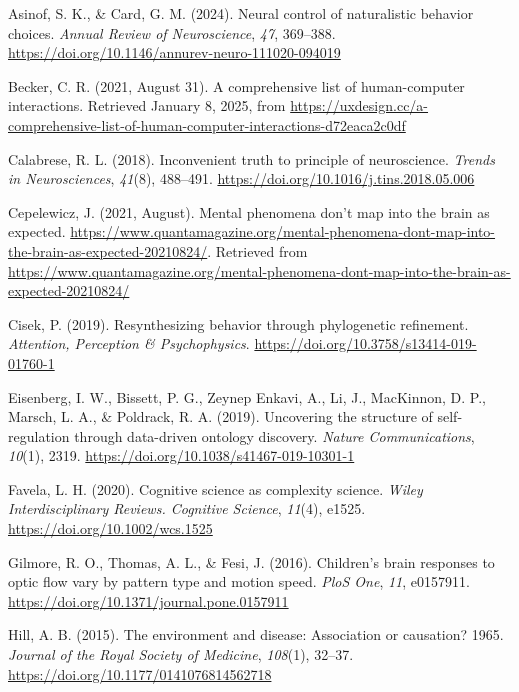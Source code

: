 \documentclass[
  letterpaper,
  DIV=11,
  numbers=noendperiod]{scrartcl}
\newlength{\cslhangindent}
\newenvironment{CSLReferences}[2] %
 {\begin{list}{}{%
  \setlength{\itemindent}{0pt}
  \setlength{\leftmargin}{0pt}
  \setlength{\parsep}{0pt}
  \ifodd #1
   \setlength{\leftmargin}{\cslhangindent}
   \setlength{\itemindent}{-1\cslhangindent}
  \fi
  \setlength{\itemsep}{#2\baselineskip}}}
 {\end{list}}
\begin{document}
\label{refs}
\begin{CSLReferences}{1}{0}
Asinof, S. K., \& Card, G. M. (2024). Neural control of naturalistic
behavior choices. \emph{Annual Review of Neuroscience}, \emph{47},
369--388. \url{https://doi.org/10.1146/annurev-neuro-111020-094019}

Becker, C. R. (2021, August 31). A comprehensive list of human-computer
interactions. Retrieved January 8, 2025, from
\url{https://uxdesign.cc/a-comprehensive-list-of-human-computer-interactions-d72eaca2c0df}

Calabrese, R. L. (2018). Inconvenient truth to principle of
neuroscience. \emph{Trends in Neurosciences}, \emph{41}(8), 488--491.
\url{https://doi.org/10.1016/j.tins.2018.05.006}

Cepelewicz, J. (2021, August). Mental phenomena don't map into the brain
as expected.
\url{https://www.quantamagazine.org/mental-phenomena-dont-map-into-the-brain-as-expected-20210824/}.
Retrieved from
\url{https://www.quantamagazine.org/mental-phenomena-dont-map-into-the-brain-as-expected-20210824/}

Cisek, P. (2019). Resynthesizing behavior through phylogenetic
refinement. \emph{Attention, Perception \& Psychophysics}.
\url{https://doi.org/10.3758/s13414-019-01760-1}

Eisenberg, I. W., Bissett, P. G., Zeynep Enkavi, A., Li, J., MacKinnon,
D. P., Marsch, L. A., \& Poldrack, R. A. (2019). Uncovering the
structure of self-regulation through data-driven ontology discovery.
\emph{Nature Communications}, \emph{10}(1), 2319.
\url{https://doi.org/10.1038/s41467-019-10301-1}

Favela, L. H. (2020). Cognitive science as complexity science.
\emph{Wiley Interdisciplinary Reviews. Cognitive Science}, \emph{11}(4),
e1525. \url{https://doi.org/10.1002/wcs.1525}

Gilmore, R. O., Thomas, A. L., \& Fesi, J. (2016). Children's brain
responses to optic flow vary by pattern type and motion speed.
\emph{PloS One}, \emph{11}, e0157911.
\url{https://doi.org/10.1371/journal.pone.0157911}

Hill, A. B. (2015). The environment and disease: Association or
causation? 1965. \emph{Journal of the Royal Society of Medicine},
\emph{108}(1), 32--37. \url{https://doi.org/10.1177/0141076814562718}


\end{CSLReferences}
\end{document}
